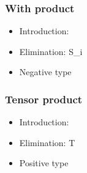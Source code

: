 \documentclass{beamer}
\begin{document}
  \begin{frame}
    \frametitle{With product}
    \begin{itemize}
    \item Introduction:
                {\alert<2>{\ctx{\Gamma}{\Delta}} \vdash {} \ni {}}
      \bigskip
    \item Elimination:
                {\alert<3>{\ctx{\Gamma}{\Delta}} \vdash {} \in S_i}
      \bigskip
    \item Negative type
    \end{itemize}
  \end{frame}
  \begin{frame}
    \frametitle{Tensor product}
    \begin{itemize}
    \item Introduction:
                {\alert<4>{\ctx{\Gamma}{\Delta}} \vdash {} \ni {}}
      \bigskip
    \item Elimination:
                {\alert<7>{\ctx{\Gamma}{\Delta}} \vdash {} \in T}
      \bigskip
    \item Positive type
    \end{itemize}
  \end{frame}
\end{document}
